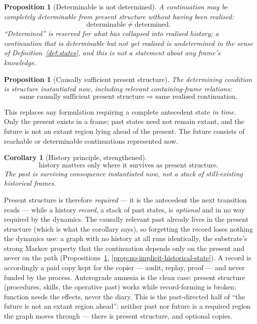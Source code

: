 \documentclass[11pt,a4paper]{article}
\newtheorem{proposition}[definition]{Proposition}
\newtheorem{corollary}[definition]{Corollary}
\theoremstyle{remark}\newtheorem{remark}[definition]{Remark}
\begin{document}
\begin{proposition}[Determinable is not determined]\label{prop:determinable}
A continuation may be completely determinable from present structure without having been realised:
\[
\boxed{\text{determinable}\neq\text{determined}.}
\]
``Determined'' is reserved for what has collapsed into realised history; a continuation that is determinable but not yet realised is \emph{undetermined} in the sense of Definition~\ref{def:states}, and this is not a statement about any frame's knowledge.
\end{proposition}

\begin{proposition}[Causally sufficient present structure]\label{prop:present-sufficiency}
The determining condition is structure instantiated \emph{now}, including relevant containing-frame relations:
\[
\boxed{\text{same causally sufficient present structure}\Rightarrow\text{same realised continuation}.}
\]
\end{proposition}
This replaces any formulation requiring a complete antecedent state \emph{in time}. Only the present exists in a frame; past states need not remain extant, and the future is not an extant region lying ahead of the present. The future consists of reachable or determinable continuations represented now.

\begin{corollary}[History principle, strengthened]\label{cor:history}
\[
\boxed{\text{history matters only where it survives as present structure}.}
\]
The past is surviving consequence instantiated now, not a stack of still-existing historical frames.
\end{corollary}
Present structure is therefore \emph{required} --- it is the antecedent the next transition reads --- while a history \emph{record}, a stack of past states, is \emph{optional} and in no way required by the dynamics. The causally relevant past already lives in the present structure (which is what the corollary says), so forgetting the record loses nothing the dynamics use: a graph with no history at all runs identically, the substrate's strong Markov property that the continuation depends only on the present and never on the path (Propositions~\ref{prop:present-sufficiency}, \ref{prop:no-implicit-historical-state}). A record is accordingly a paid copy kept for the copier --- audit, replay, proof --- and never funded by the process. Anterograde amnesia is the clean case: present structure (procedures, skills, the operative past) works while record-forming is broken; function needs the effects, never the diary. This is the past-directed half of ``the future is not an extant region ahead'': neither past nor future is a required region the graph moves through --- there is present structure, and optional copies.
\end{document}
